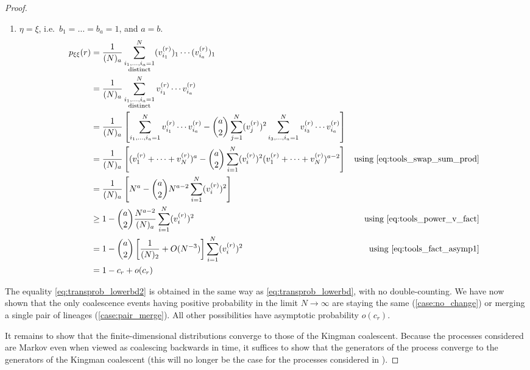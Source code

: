 \documentclass{article}
\begin{document}
\begin{proof}
\begin{enumerate}[label = \textbf{Case \arabic*.}]
\item\label{case:no_change} $\eta=\xi$, i.e.\ $b_1=\dots=b_a=1$, and $a=b$.
\begin{align}
p_{\xi\xi}(r) &= \frac{1}{(N)_a} \sum_{\substack{i_1,\dots,i_a =1 \\ \text{distinct}}}^{N} (v_{i_1}^{(r)})_1  \cdots (v_{i_a}^{(r)})_1 & \notag\\
&= \frac{1}{(N)_a} \sum_{\substack{i_1,\dots,i_a =1 \\ \text{distinct}}}^{N} v_{i_1}^{(r)} \cdots v_{i_a}^{(r)} & \notag\\
&= \frac{1}{(N)_a} \left[ \sum_{i_1,\dots,i_a =1}^N v_{i_1}^{(r)} \cdots v_{i_a}^{(r)} - \binom{a}{2}\sum_{j=1}^N (v_j^{(r)})^2 \sum_{i_3,\dots,i_a =1}^N v_{i_3}^{(r)} \cdots v_{i_a}^{(r)} \right] &\label{eq:transprob_lowerbd2}\\
&= \frac{1}{(N)_a} \left[ (v_1^{(r)}+\dots+v_N^{(r)})^a - \binom{a}{2} \sum_{i=1}^N (v_i^{(r)})^2 (v_1^{(r)}+\dots+v_N^{(r)})^{a-2} \right] &\text{using \eqref{eq:tools_swap_sum_prod}} \notag\\
&= \frac{1}{(N)_a} \left[ N^a - \binom{a}{2} N^{a-2} \sum_{i=1}^N (v_i^{(r)})^2 \right] &\notag\\
&\geq 1- \binom{a}{2} \frac{N^{a-2}}{(N)_a} \sum_{i=1}^N (v_i^{(r)})^2 &\text{using \eqref{eq:tools_power_v_fact}}\notag\\
&= 1- \binom{a}{2} \left[ \frac{1}{(N)_2} + O(N^{-3}) \right] \sum_{i=1}^N (v_i^{(r)})^2 &\text{using \eqref{eq:tools_fact_asymp1}}\\
&= 1- c_r +o(c_r) &\notag
\end{align}
\end{enumerate}
The equality \eqref{eq:transprob_lowerbd2} is obtained in the same way as \eqref{eq:transprob_lowerbd}, with no double-counting.
We have now shown that the only coalescence events having positive probability in the limit $N\to\infty$ are staying the same (\ref{case:no_change}) or merging a single pair of lineages (\ref{case:pair_merge}). All other possibilities have asymptotic probability $o(c_r)$.

It remains to show that the finite-dimensional distributions converge to those of the Kingman coalescent. Because the processes considered are Markov even when viewed as coalescing backwards in time, it suffices to show that the generators of the process converge to the generators of the Kingman coalescent (this will no longer be the case for the processes considered in \citet{koskela2018}).
\end{proof}
\end{document}
